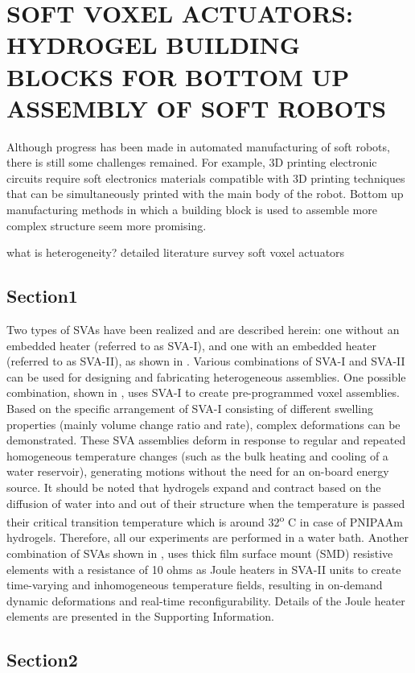 \chapter{SOFT VOXEL ACTUATORS: HYDROGEL BUILDING BLOCKS FOR BOTTOM UP ASSEMBLY OF SOFT ROBOTS}
Although progress has been made in automated manufacturing of soft robots, there is still some challenges remained. For example, 3D printing electronic circuits require soft electronics materials compatible with 3D printing techniques that can be simultaneously printed with the main body of the robot. Bottom up manufacturing methods in which a building block is used to assemble more complex structure seem more promising. 

what is heterogeneity?
detailed literature survey
soft voxel actuators
\section{Section1}
Two types of SVAs have been realized and are described herein: one without an embedded heater (referred to as SVA-I), and one with an embedded heater (referred to as SVA-II), as shown in . Various combinations of SVA-I and SVA-II can be used for designing and fabricating heterogeneous assemblies. One possible combination, shown in , uses SVA-I to create pre-programmed voxel assemblies. Based on the specific arrangement of SVA-I consisting of different swelling properties (mainly volume change ratio and rate), complex deformations can be demonstrated. These SVA assemblies deform in response to regular and repeated homogeneous temperature changes (such as the bulk heating and cooling of a water reservoir), generating motions without the need for an on-board energy source. It should be noted that hydrogels expand and contract based on the diffusion of water into and out of their structure when the temperature is passed their critical transition temperature which is around 32\textsuperscript{o} C in case of PNIPAAm hydrogels. Therefore, all our experiments are performed in a water bath. Another combination of SVAs shown in , uses thick film surface mount (SMD) resistive elements with a resistance of 10 ohms as Joule heaters in SVA-II units to create time-varying and inhomogeneous temperature fields, resulting in on-demand dynamic deformations and real-time reconfigurability. Details of the Joule heater elements are presented in the Supporting Information.\\ 
\section{Section2}

